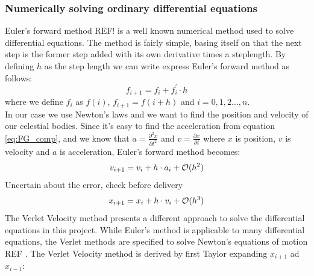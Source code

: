\documentclass{article}
\newcommand{\husk}[1]{\color{red} #1 \color{black}}
\begin{document}
\subsubsection{Numerically solving ordinary differential equations}
Euler's forward method \husk{REF!} is a well known numerical method used to solve differential equations. The method is fairly simple, basing itself on that the next step is the former step added with its own derivative times a steplength. By defining $h$ as the step length we can write express Euler's forward method as follows:
\begin{equation}
f_{i + 1} = f_i + f^{'}_i \cdot h
\label{eq:fwdEuler}
\end{equation}
where we define $f_i$ as $f(i)$, $f_{i+1} = f(i + h)$ and $i = 0, 1, 2 ... , n$. \\
In our case we use Newton's laws and we want to find the position and velocity of our celestial bodies. Since it's easy to find the acceleration from equation \eqref{eq:FG_comp}, and we know that $a = \frac{\partial^2 x}{\partial t^2}$ and $v = \frac{\partial x}{\partial t}$ where $x$ is position, $v$ is velocity and $a$ is acceleration, Euler's forward method becomes:
\begin{equation}
v_{i + 1} = v_i + h \cdot a_i + \mathcal{O}(h^2)\\
\label{eq:Eulervel}
\end{equation}
\husk{Uncertain about the error, check before delivery}
\begin{equation}
x_{i + 1} = x_i + h \cdot v_i + \mathcal{O}(h^3)\\
\label{eq:Eulerpos}
\end{equation}
The Verlet Velocity method presents a different approach to solve the differential equations in this project. While Euler's method is applicable to many differential equations, the Verlet methods are specified to solve Newton's equations of motion \husk{REF}. The Verlet Velocity method is derived by first Taylor expanding $x_{i + 1}$ ad $x_{i-1}$:
\end{document}
